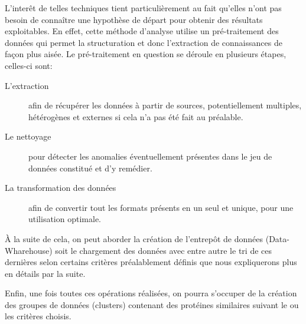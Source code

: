 L'inter\^et de telles techniques tient particulièrement au fait qu'elles n'ont pas besoin de connaître une hypothèse de départ pour obtenir des résultats exploitables. En effet, cette méthode d'analyse utilise un pré-traitement des données qui permet la structuration et donc l'extraction de connaissances de façon plus aisée. Le pré-traitement en question se déroule en plusieurs étapes, celles-ci sont:
\begin{description}
\item[L'extraction] afin de récupérer les données à partir de sources, potentiellement multiples, hétérogènes et externes si cela n'a pas été fait au préalable.
\item[Le nettoyage] pour détecter les anomalies éventuellement présentes dans le jeu de données constitué et d'y remédier.
\item[La transformation des données] afin de convertir tout les formats présents en un seul et unique, pour une utilisation optimale.
\end{description}

À la suite de cela, on peut aborder la création de l'entrepôt de données (Data-Wharehouse) soit le chargement des données avec entre autre le tri de ces dernières selon certains critères préalablement définis que nous expliquerons plus en détails par la suite.

Enfin, une fois toutes ces opérations réalisées, on pourra s'occuper de la création des groupes de données (clusters) contenant des protéines similaires suivant le ou les critères choisis.
